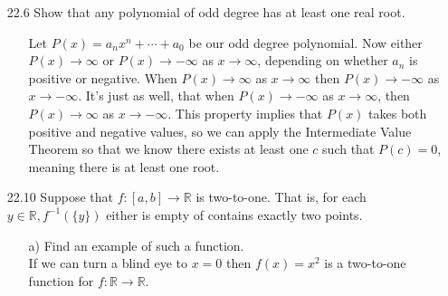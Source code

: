 \documentclass[12pt]{article}
\begin{document}
\begin{enumerate}
\begin{enumerate}
\item[22.6] Show that any polynomial of odd degree has at least one real root.
\begin{enumerate}
\item[] Let $P(x) = a_nx^n + \cdots + a_0$ be our odd degree polynomial.
Now either $P(x) \rightarrow \infty$ or $P(x) \rightarrow -\infty$ as
$x \rightarrow \infty$, depending on whether $a_n$ is positive or negative. 
When $P(x) \rightarrow \infty$ as $x \rightarrow \infty$ then
$P(x) \rightarrow -\infty$ as $x \rightarrow -\infty$. It's just as well, that
when $P(x) \rightarrow -\infty$ as $x \rightarrow \infty$, then $P(x) \to \infty$
as $x \rightarrow -\infty$. This property implies that $P(x)$ takes both
positive and negative values, so we can apply the Intermediate Value Theorem
so that we know there exists at least one $c$ such that $P(c) = 0$, meaning
there is at least one root. 
\end{enumerate}

\item[22.10] Suppose that $f: [a, b] \rightarrow \mathbb{R}$ is two-to-one. That is, for each $y \in \mathbb{R}, f^{-1}(\{y\})$ either is empty of contains exactly two points.
\begin{enumerate}
\item[a)] Find an example of such a function. \\
If we can turn a blind eye to $x = 0$ then $f(x) = x^2$ is a 
two-to-one function for $f: \mathbb{R} \rightarrow \mathbb{R}$.
\end{enumerate}


\end{enumerate}
\end{enumerate}
\end{document}
